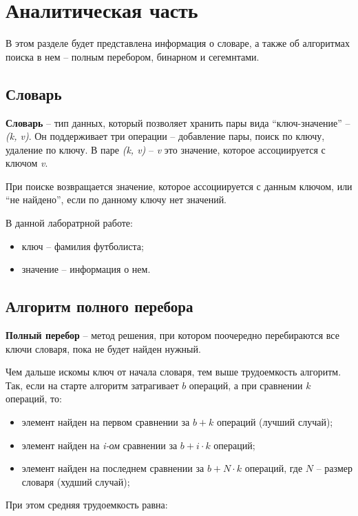 \chapter{Аналитическая часть}
В этом разделе будет представлена информация о словаре, а также об алгоритмах поиска в нем -- полным перебором, бинарном и сегемнтами.


\section{Словарь}

\textbf{Словарь} \cite{dictionary} -- тип данных, который позволяет хранить пары вида “ключ-значение” -- \textit{(k, v)}. Он поддерживает три операции -- добавление пары, поиск по ключу, удаление по ключу. В паре \textit{(k, v)} -- \textit{v} это значение, которое ассоциируется с ключом \textit{v}.

При поиске возвращается значение, которое ассоциируется с данным ключом, или “не найдено”, если по данному ключу нет значений.

В данной лаборатрной работе:
\begin{itemize}
	\item ключ -- фамилия футболиста;
	\item значение -- информация о нем.
\end{itemize}


\section{Алгоритм полного перебора}

\textbf{Полный перебор} \cite{search-full} -- метод решения, при котором поочередно перебираются все ключи словаря, пока не будет найден нужный.

Чем дальше искомы ключ от начала словаря, тем выше трудоемкость алгоритм. Так, если на старте алгоритм затрагивает $b$ операций, а при сравнении $k$ операций, то:
\begin{itemize}
	\item элемент найден на первом сравнении за $b + k$ операций (лучший случай);
	\item элемент найден на \textit{i-ом} сравнении за $b + i \cdot k$ операций;
	\item элемент найден на последнем сравнении за $b +  N \cdot k$ операций, где $N$ -- размер словаря (худший случай);
\end{itemize}

При этом средняя трудоемкость равна:

